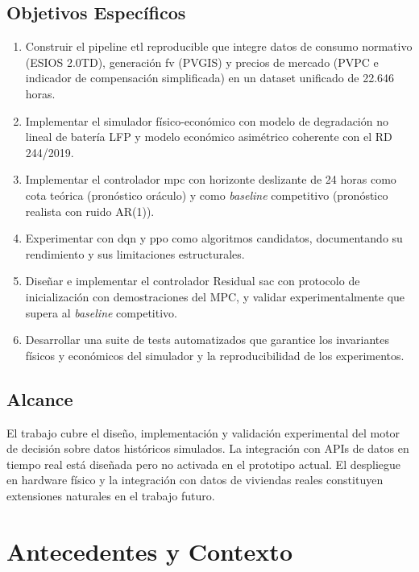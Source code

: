 \documentclass[12pt, a4paper, twoside]{report}
\begin{document}
\section{Objetivos Específicos}

\begin{enumerate}[label=\textbf{OE\arabic*.}]
  \item Construir el pipeline \acrshort{etl} reproducible que integre datos de
    consumo normativo (ESIOS 2.0TD), generación \acrshort{fv} (PVGIS) y precios
    de mercado (PVPC e indicador de compensación simplificada) en un dataset
    unificado de 22.646 horas.
  \item Implementar el simulador físico-económico con modelo de degradación no
    lineal de batería LFP y modelo económico asimétrico coherente con el
    RD 244/2019.
  \item Implementar el controlador \acrshort{mpc} con horizonte deslizante de
    24 horas como cota teórica (pronóstico oráculo) y como \textit{baseline}
    competitivo (pronóstico realista con ruido AR(1)).
  \item Experimentar con \acrshort{dqn} y \acrshort{ppo} como algoritmos
    candidatos, documentando su rendimiento y sus limitaciones estructurales.
  \item Diseñar e implementar el controlador Residual \acrshort{sac} con
    protocolo de inicialización con demostraciones del MPC, y validar
    experimentalmente que supera al \textit{baseline} competitivo.
  \item Desarrollar una suite de tests automatizados que garantice los
    invariantes físicos y económicos del simulador y la reproducibilidad
    de los experimentos.
\end{enumerate}

\section{Alcance}

El trabajo cubre el diseño, implementación y validación experimental del motor
de decisión sobre datos históricos simulados. La integración con APIs de datos
en tiempo real está diseñada pero no activada en el prototipo actual. El
despliegue en hardware físico y la integración con datos de viviendas reales
constituyen extensiones naturales en el trabajo futuro.

\chapter{Antecedentes y Contexto}
\label{chap:antecedentes}
\end{document}
